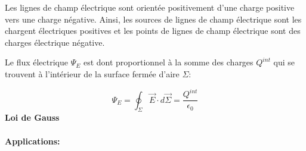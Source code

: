 \documentclass[
    11pt,
    a4paper,
    oneside,
    headinlcude, footinclude,
    twoside,
]{report}
\renewcommand{\vec}[1]{\overrightarrow{#1}}
\begin{document}


Les lignes de champ électrique sont orientée positivement d'une charge positive
vers une charge négative. Ainsi, les sources de lignes de champ électrique sont
les chargent électriques positives et les points de lignes de champ électrique
sont des charges électrique négative.

Le flux électrique $\Psi_E$ est dont proportionnel à la somme des charges $Q^{int}$
qui se trouvent à l'intérieur de la surface fermée d'aire $\Sigma$:

\begin{equation}
    \label{eq:7.22}
    \Psi_E = \oint_{\Sigma} \vec E \cdot d \vec \Sigma = \frac{Q^{int}}{\epsilon_0}
\end{equation}
\textbf{Loi de Gauss} 


\paragraph{Applications:}
\label{par:applications}
\end{document}
